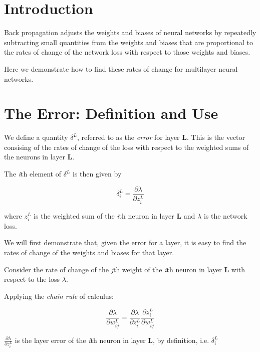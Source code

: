 \documentclass[12pt]{article}
\begin{document}
\maketitle

\section{Introduction}
Back propagation adjusts the weights and biases of neural networks by repeatedly subtracting small quantities from the weights and biases that are proportional to the rates of change of the network loss with respect to those weights and biases.

Here we demonstrate how to find these rates of change for multilayer neural networks. 

\section{The Error: Definition and Use}

We define a quantity $\delta^{L}$, referred to as the \textit{error} for layer \textbf{L}. This is the vector consising of the rates of change of the loss with respect to the weighted sums of the neurons in layer \textbf{L}.

The \textit{i}th element of $\delta^{L}$ is then given by

\begin{equation} \label{eq:1}
\delta^{L}_{i}=\frac{\partial \lambda}{\partial z_{i}^{L}}
\end{equation}

where $z_{i}^{L}$ is the weighted sum of the \textit{i}th neuron in layer \textbf{L} and $\lambda$ is the network loss.

We will first demonstrate that, given the error for a layer, it is easy to find the rates of change of the weights and biases for that layer.

Consider the rate of change of the \textit{j}th weight of the \textit{i}th neuron in layer \textbf{L} with respect to the loss $\lambda$.

Applying the \textit{chain rule} of calculus:

\begin{equation} \label{eq:2}
\frac{\partial \lambda}{\partial w^{L}_{ij}}=\frac{\partial \lambda}{\partial z^{L}_{i}}
\frac{\partial z^{L}_{i}}{\partial w^{L}_{ij}}\end{equation}

$\frac{\partial \lambda}{\partial z^{L}_{i}}$ is the layer error of the \textit{i}th neuron in layer \textbf{L}, by definition, i.e. $\delta^{L}_{i}$
\end{document}
